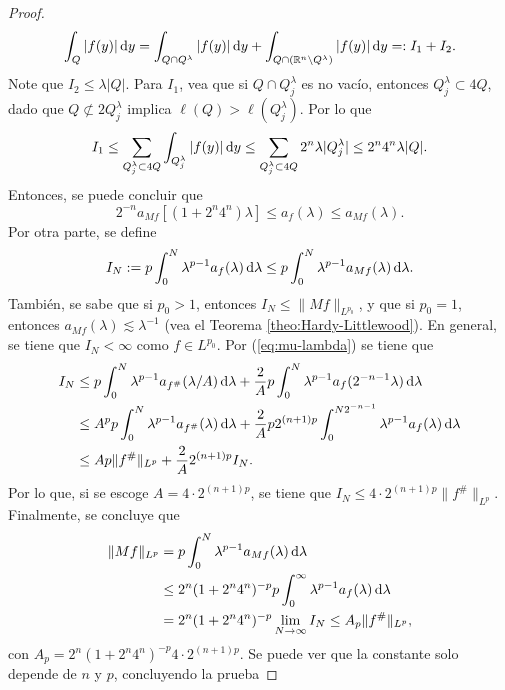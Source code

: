 \begin{proof}
	\begin{equation*}
		\int_Q|f(y)|\mathop{}\!\mathrm{d} y = \int_{Q\cap Q^\lambda} |f(y)|\mathop{}\!\mathrm{d} y + \int_{Q\cap (\mathbb{R}^n\setminus Q^\lambda)} |f(y)|\mathop{}\!\mathrm{d} y =: I_1 + I_2.
	\end{equation*}
	Note que $I_2 \leq \lambda |Q|$. Para $I_1$, vea que si $Q\cap Q_j^\lambda$ es no vacío, entonces $Q_j^\lambda \subset 4Q$, dado que $Q \not\subset 2Q_j^\lambda$ implica $\ell(Q) > \ell(Q_j^\lambda)$. Por lo que 
	\begin{equation*}
		I_1 \leq \sum_{Q_j^\lambda\subset4Q} \int_{Q_j^\lambda} |f(y)|\mathop{}\!\mathrm{d} y \leq \sum_{Q_j^\lambda\subset4Q} 2^n\lambda |Q_j^\lambda| \leq 2^n4^n\lambda|Q|.
	\end{equation*}
	Entonces, se puede concluir que 
	\begin{equation}\label{eq:mu-density}
		2^{-n}a_{Mf}[(1+2^n4^n)\lambda] \leq a_{f}(\lambda) \leq a_{Mf}(\lambda).
	\end{equation}
	Por otra parte, se define 
	\begin{equation*}
		I_N := p\int_0^N\lambda^{p-1}a_{f}(\lambda)\mathop{}\!\mathrm{d} \lambda \leq p\int_0^N\lambda^{p-1}a_{Mf}(\lambda)\mathop{}\!\mathrm{d} \lambda.
	\end{equation*}
	También, se sabe que si $p_0>1$, entonces $I_N\leq \|Mf\|_{L^{p_0}}$, y que si $p_0=1$, entonces $a_{Mf}(\lambda)\lesssim \lambda^{-1}$ (vea el Teorema \ref{theo:Hardy-Littlewood}). En general, se tiene que $I_N<\infty$ como $f\in L^{p_0}$. Por (\ref{eq:mu-lambda}) se tiene que 
	\begin{align*}
		I_N & \leq p\int_0^N\lambda^{p-1}a_{f^\#}(\lambda/A)\mathop{}\!\mathrm{d}\lambda + \frac{2}{A}p\int_0^N\lambda^{p-1}a_{f}(2^{-n-1}\lambda)\mathop{}\!\mathrm{d} \lambda \\
		& \leq A^p p\int_0^N\lambda^{p-1}a_{f^\#}(\lambda)\mathop{}\!\mathrm{d}\lambda +\frac{2}{A} p2^{(n+1)p} \int_0^{N2^{-n-1}}\lambda^{p-1} a_{f}(\lambda)\mathop{}\!\mathrm{d}\lambda \\
		& \leq Ap\|f^\#\|_{L^p} + \frac{2}{A}2^{(n+1)p} I_N.
	\end{align*}
	Por lo que, si se escoge $A=4\cdot2^{(n+1)p}$, se tiene que $I_N \leq 4\cdot 2^{(n+1)p}\|f^\#\|_{L^p}$. Finalmente, se concluye que 
	\begin{align*}
		\|Mf\|_{L^p} & = p\int_0^N\lambda^{p-1}a_{Mf}(\lambda)\mathop{}\!\mathrm{d} \lambda \\
		& \leq 2^n(1+2^n4^n)^{-p} p\int_0^\infty\lambda^{p-1}a_{f}(\lambda)\mathop{}\!\mathrm{d} \lambda \\
		& =2^n(1+2^n4^n)^{-p}  \lim_{N\to\infty} I_N \leq A_p\|f^\#\|_{L^p},
	\end{align*}
	con $A_p = 2^n(1+2^n4^n)^{-p} 4\cdot 2^{(n+1)p}$. Se puede ver que la constante solo depende de $n$ y $p$, concluyendo la prueba
\end{proof}
